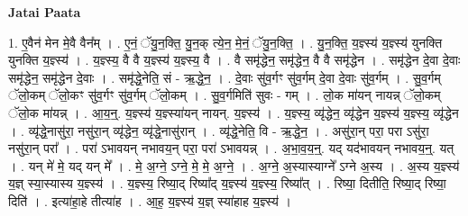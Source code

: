 \documentclass[17pt]{extarticle}
\begin{document}
\textbf{Jatai Paata} \newline

1. ए॒वैन॑ मेन मे॒वै वैन᳚म् । . ए॒नं॒ ॅयु॒न॒क्ति॒ यु॒न॒क् त्ये॒न॒ मे॒नं॒ ॅयु॒न॒क्ति॒ । . यु॒न॒क्ति॒ य॒ज्ञ्स्य॑ य॒ज्ञ्स्य॑ युनक्ति युनक्ति य॒ज्ञ्स्य॑ । . य॒ज्ञ्स्य॒ वै वै य॒ज्ञ्स्य॑ य॒ज्ञ्स्य॒ वै । . वै समृ॑द्धेन॒ समृ॑द्धेन॒ वै वै समृ॑द्धेन । . समृ॑द्धेन दे॒वा दे॒वाः समृ॑द्धेन॒ समृ॑द्धेन दे॒वाः । . समृ॑द्धे॒नेति॒ सं - ऋ॒द्धे॒न॒ । . दे॒वाः सु॑व॒र्गꣳ सु॑व॒र्गम् दे॒वा दे॒वाः सु॑व॒र्गम् । . सु॒व॒र्गम् ॅलो॒कम् ॅलो॒कꣳ सु॑व॒र्गꣳ सु॑व॒र्गम् ॅलो॒कम् । . सु॒व॒र्गमिति॑ सुवः - गम् । . लो॒क मा॑यन् नायन्न् ॅलो॒कम् ॅलो॒क मा॑यन्न् । . आ॒य॒न्॒. य॒ज्ञ्स्य॑ य॒ज्ञ्स्या॑यन् नायन्. य॒ज्ञ्स्य॑ । . य॒ज्ञ्स्य॒ व्यृ॑द्धेन॒ व्यृ॑द्धेन य॒ज्ञ्स्य॑ य॒ज्ञ्स्य॒ व्यृ॑द्धेन । . व्यृ॑द्धे॒नासु॑रा॒ नसु॑रा॒न् व्यृ॑द्धेन॒ व्यृ॑द्धे॒नासु॑रान् । . व्यृ॑द्धे॒नेति॒ वि - ऋ॒द्धे॒न॒ । . असु॑रा॒न् परा॒ परा ऽसु॑रा॒ नसु॑रा॒न् परा᳚ । . परा॑ ऽभावयन् नभावय॒न् परा॒ परा॑ ऽभावयन्न् । . अ॒भा॒व॒य॒न्॒. यद् यद॑भावयन् नभावय॒न्॒. यत् । . यन् मे॑ मे॒ यद् यन् मे᳚ । . मे॒ अ॒ग्ने॒ ऽग्ने॒ मे॒ मे॒ अ॒ग्ने॒ । . अ॒ग्ने॒ अ॒स्यास्याग्ने᳚ ऽग्ने अ॒स्य । . अ॒स्य य॒ज्ञ्स्य॑ य॒ज्ञ् स्या॒स्यास्य य॒ज्ञ्स्य॑ । . य॒ज्ञ्स्य॒ रिष्या॒द् रिष्या᳚द् य॒ज्ञ्स्य॑ य॒ज्ञ्स्य॒ रिष्या᳚त् । . रिष्या॒ दितीति॒ रिष्या॒द् रिष्या॒ दिति॑ । . इत्या॑हा॒हे तीत्या॑ह । . आ॒ह॒ य॒ज्ञ्स्य॑ य॒ज्ञ् स्या॑हाह य॒ज्ञ्स्य॑ । \newline
\end{document}

